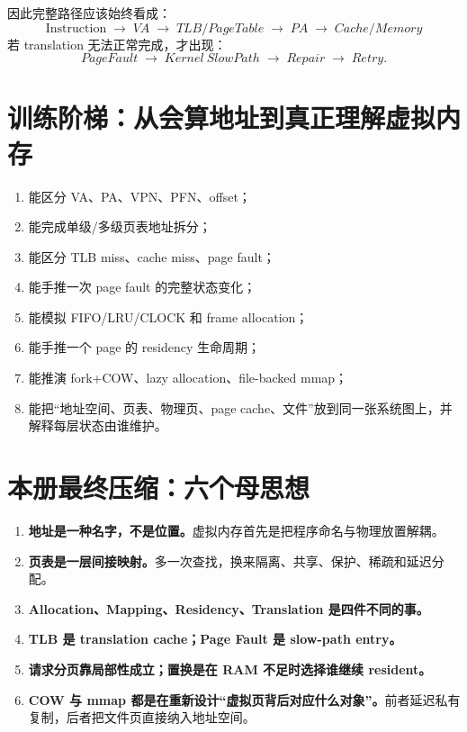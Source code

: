 \documentclass[11pt,a4paper]{ctexart}
\newcommand{\kw}[1]{\textbf{#1}}
\newcommand{\arr}{\;\longrightarrow\;}
\begin{document}
因此完整路径应该始终看成：
\[
\boxed{
\text{Instruction}
\arr VA
\arr TLB/PageTable
\arr PA
\arr Cache/Memory
}
\]
若 translation 无法正常完成，才出现：
\[
\boxed{PageFault\arr Kernel\ SlowPath\arr Repair\arr Retry.}
\]

\section{训练阶梯：从会算地址到真正理解虚拟内存}
\begin{enumerate}[label=\textbf{L\arabic*.}]
  \item 能区分 VA、PA、VPN、PFN、offset；
  \item 能完成单级/多级页表地址拆分；
  \item 能区分 TLB miss、cache miss、page fault；
  \item 能手推一次 page fault 的完整状态变化；
  \item 能模拟 FIFO/LRU/CLOCK 和 frame allocation；
  \item 能手推一个 page 的 residency 生命周期；
  \item 能推演 fork+COW、lazy allocation、file-backed mmap；
  \item 能把“地址空间、页表、物理页、page cache、文件”放到同一张系统图上，并解释每层状态由谁维护。
\end{enumerate}

\section{本册最终压缩：六个母思想}
\begin{corebox}[只允许带走六句话时]
\begin{enumerate}
  \item \kw{地址是一种名字，不是位置。}虚拟内存首先是把程序命名与物理放置解耦。
  \item \kw{页表是一层间接映射。}多一次查找，换来隔离、共享、保护、稀疏和延迟分配。
  \item \kw{Allocation、Mapping、Residency、Translation 是四件不同的事。}
  \item \kw{TLB 是 translation cache；Page Fault 是 slow-path entry。}
  \item \kw{请求分页靠局部性成立；置换是在 RAM 不足时选择谁继续 resident。}
  \item \kw{COW 与 mmap 都是在重新设计“虚拟页背后对应什么对象”。}前者延迟私有复制，后者把文件页直接纳入地址空间。
\end{enumerate}
\end{corebox}
\end{document}
